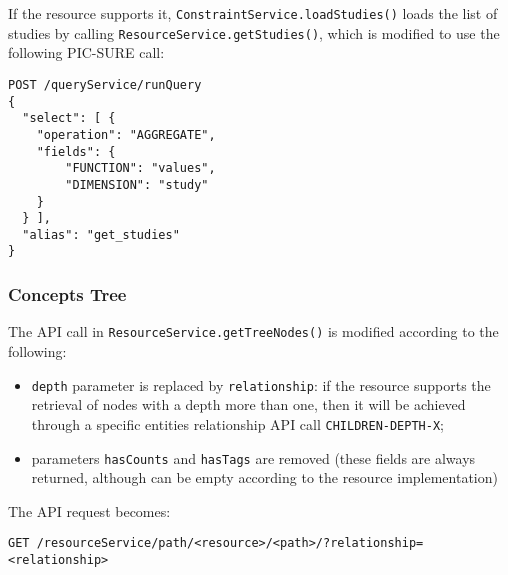 If the resource supports it, \verb|ConstraintService.loadStudies()| loads the list of studies by calling \verb|ResourceService.getStudies()|, which is modified to use the following PIC-SURE call:
\begin{verbatim}
POST /queryService/runQuery
{
  "select": [ {
    "operation": "AGGREGATE",
    "fields": {
        "FUNCTION": "values",
        "DIMENSION": "study"
    }
  } ],
  "alias": "get_studies"
}
\end{verbatim}



\subsubsection{Concepts Tree}
\label{sec:gb-tree}


The API call in \verb|ResourceService.getTreeNodes()| is modified according to the following:
\begin{itemize}
     \item \verb|depth| parameter is replaced by \verb|relationship|: if the resource supports the retrieval of nodes with a depth more than one, then it will be achieved through a specific entities relationship API call \verb|CHILDREN-DEPTH-X|; 
    \item parameters \verb|hasCounts| and \verb|hasTags| are removed (these fields are always returned, although can be empty according to the resource implementation)
\end{itemize}

The API request becomes:
\begin{verbatim}
GET /resourceService/path/<resource>/<path>/?relationship=<relationship>
\end{verbatim}

